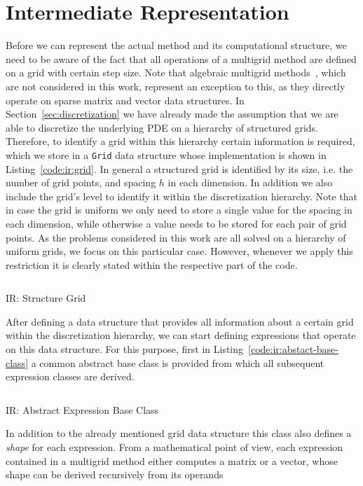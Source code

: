 \section{Intermediate Representation}
\label{sec:intermediate-representation}
Before we can represent the actual method and its computational structure, we need to be aware of the fact that all operations of a multigrid method are defined on a grid with certain step size.
Note that algebraic multigrid methods~\cite{stuben2001introduction,ruge1987algebraic}, which are not considered in this work, represent an exception to this, as they directly operate on sparse matrix and vector data structures.
In Section~\ref{sec:discretization} we have already made the assumption that we are able to discretize the underlying PDE on a hierarchy of structured grids.
Therefore, to identify a grid within this hierarchy certain information is required, which we store in a \texttt{Grid} data structure whose implementation is shown in Listing~\ref{code:ir:grid}.
In general a structured grid is identified by its size, i.e. the number of grid points, and spacing $h$ in each dimension.
In addition we also include the grid's level to identify it within the discretization hierarchy.
Note that in case the grid is uniform we only need to store a single value for the spacing in each dimension, while otherwise a value needs to be stored for each pair of grid points.
As the problems considered in this work are all solved on a hierarchy of uniform grids, we focus on this particular case.
However, whenever we apply this restriction it is clearly stated within the respective part of the code.  
\begin{listing}
	\inputminted{python}{evostencils/ir/grid.py}
	\caption{IR: Structure Grid}
	\label{code:ir:grid}
\end{listing}
After defining a data structure that provides all information about a certain grid within the discretization hierarchy, we can start defining expressions that operate on this data structure.
For this purpose, first in Listing~\ref{code:ir:abstact-base-class} a common abstract base class is provided from which all subsequent expression classes are derived.
\begin{listing}
	\inputminted{python}{evostencils/ir/expression.py}
	\caption{IR: Abstract Expression Base Class}
	\label{code:ir:abstact-base-class}
\end{listing}
In addition to the already mentioned grid data structure this class also defines a \emph{shape} for each expression.
From a mathematical point of view, each expression contained in a multigrid method either computes a matrix or a vector, whose shape can be derived recursively from its operands
